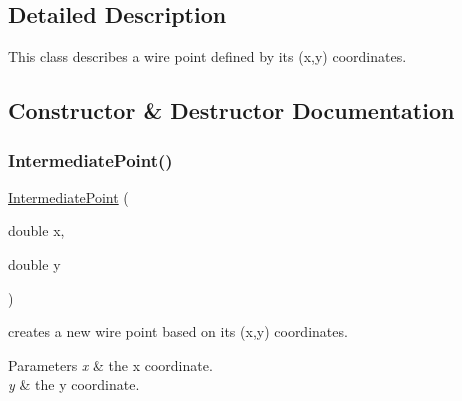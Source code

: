 \subsection{Detailed Description}
This class describes a wire point defined by its (x,y) coordinates. 

\subsection{Constructor \& Destructor Documentation}
\mbox{\label{class_open_chams_1_1_intermediate_point_ad8d801adfda3af856c5d1287c8bc0635}} 
\subsubsection{\texorpdfstring{Intermediate\+Point()}{IntermediatePoint()}}
{\footnotesize\ttfamily \mbox{\hyperlink{class_open_chams_1_1_intermediate_point}{Intermediate\+Point}} (\begin{DoxyParamCaption}\item[{double}]{x,  }\item[{double}]{y }\end{DoxyParamCaption})\hspace{0.3cm}{\ttfamily [inline]}}



creates a new wire point based on its (x,y) coordinates. 


\begin{DoxyParams}{Parameters}
{\em x} & the x coordinate. \\
\hline
{\em y} & the y coordinate. \\
\hline
\end{DoxyParams}
